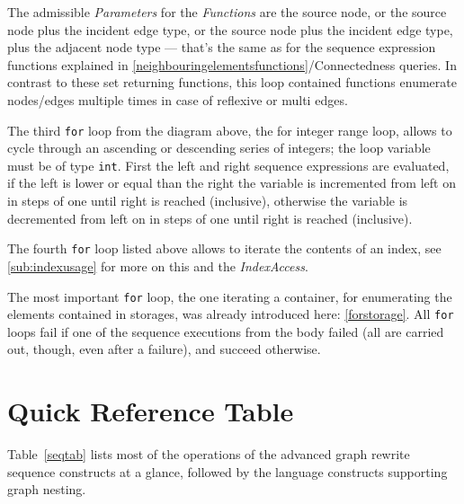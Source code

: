 The admissible \emph{Parameters} for the \emph{Functions} are the source node, or the source node plus the incident edge type, or the source node plus the incident edge type, plus the adjacent node type ---
that's the same as for the sequence expression functions explained in \ref{neighbouringelementsfunctions}/Connectedness queries.
In contrast to these set returning functions, this loop contained functions enumerate nodes/edges multiple times in case of reflexive or multi edges.

The third \texttt{for} loop from the diagram above, the for integer range loop, allows to cycle through an ascending or descending series of integers; the loop variable must be of type \texttt{int}.
First the left and right sequence expressions are evaluated,
if the left is lower or equal than the right the variable is incremented from left on in steps of one until right is reached (inclusive),
otherwise the variable is decremented from left on in steps of one until right is reached (inclusive).

The fourth \texttt{for} loop listed above allows to iterate the contents of an index, see \ref{sub:indexusage} for more on this and the \emph{IndexAccess}.

The most important \texttt{for} loop, the one iterating a container, for enumerating the elements contained in storages, was already introduced here: \ref{forstorage}.
All \texttt{for} loops fail if one of the sequence executions from the body failed (all are carried out, though, even after a failure), and succeed otherwise.


\section{Quick Reference Table}

Table~\ref{seqtab} lists most of the operations of the advanced graph rewrite sequence constructs at a glance, followed by the language constructs supporting graph nesting.

